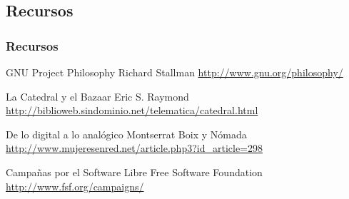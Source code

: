 \documentclass{beamer}
\begin{document}
\subsection{Recursos}
\begin{frame}
  \frametitle{Recursos}
  \small
  \begin{thebibliography}{}
    GNU Project Philosophy
    \newblock Richard Stallman
    \newblock \url{http://www.gnu.org/philosophy/}
    
    La Catedral y el Bazaar
    \newblock Eric S. Raymond
    \newblock \url{http://biblioweb.sindominio.net/telematica/catedral.html}


    De lo digital a lo analógico
    \newblock Montserrat Boix y Nómada
    \newblock \url{http://www.mujeresenred.net/article.php3?id_article=298}

    Campañas por el Software Libre
    \newblock Free Software Foundation
    \newblock \url{http://www.fsf.org/campaigns/}

  \end{thebibliography}
\end{frame}
\end{document}
